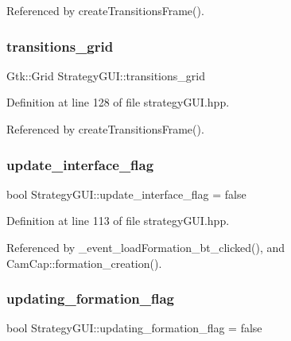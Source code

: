 Referenced by create\+Transitions\+Frame().

\mbox{\label{class_strategy_g_u_i_a1be6ca5d69ec2de3a1349ad480c9eb73}} 
\subsubsection{\texorpdfstring{transitions\+\_\+grid}{transitions\_grid}}
{\footnotesize\ttfamily Gtk\+::\+Grid Strategy\+G\+U\+I\+::transitions\+\_\+grid}



Definition at line 128 of file strategy\+G\+U\+I.\+hpp.



Referenced by create\+Transitions\+Frame().

\mbox{\label{class_strategy_g_u_i_a83d19a6d98510e3984be7196c740d1fc}} 
\subsubsection{\texorpdfstring{update\+\_\+interface\+\_\+flag}{update\_interface\_flag}}
{\footnotesize\ttfamily bool Strategy\+G\+U\+I\+::update\+\_\+interface\+\_\+flag = false}



Definition at line 113 of file strategy\+G\+U\+I.\+hpp.



Referenced by \+\_\+event\+\_\+load\+Formation\+\_\+bt\+\_\+clicked(), and Cam\+Cap\+::formation\+\_\+creation().

\mbox{\label{class_strategy_g_u_i_a46f3c766dd61236382cc2681372f6538}} 
\subsubsection{\texorpdfstring{updating\+\_\+formation\+\_\+flag}{updating\_formation\_flag}}
{\footnotesize\ttfamily bool Strategy\+G\+U\+I\+::updating\+\_\+formation\+\_\+flag = false}



